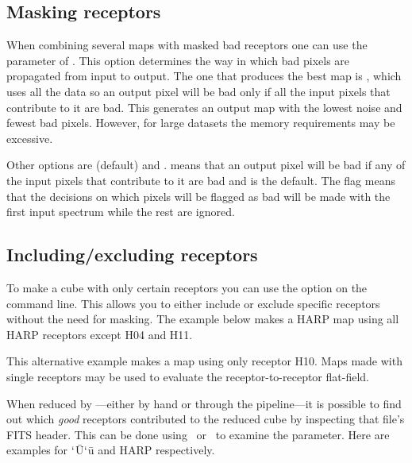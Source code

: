 \documentclass[11pt,oneside,chapters]{starlink}
\begin{document}
\subsection{Masking receptors}

When combining several maps with masked bad receptors one can use the
 parameter of \makecube. This option determines the way
in which bad pixels are propagated from input to output. The one that
produces the best map is , which uses all the data
so an output pixel will be bad only if all the input pixels that
contribute to it are bad. This generates an output map with the lowest
noise and fewest bad pixels. However, for large datasets the memory
requirements may be excessive.

Other options are  (default) and
.  means that an output pixel will be
bad if any of the input pixels that contribute to it are bad and is
the default.  The flag  means that the decisions on which pixels
will be flagged as bad will be made with the first input spectrum
while the rest are ignored.

\subsection{Including/excluding receptors}
\label{sec:incexc_receptors}

To make a cube with only certain receptors you can use the
 option on the command line. This allows you to
either include or exclude specific receptors without the need for
masking. The example below makes a HARP map using all HARP
receptors except H04 and H11.
\begin{terminalv}
\end{terminalv}
This alternative example makes a map using only receptor H10. Maps
made with single receptors may be used to evaluate the
receptor-to-receptor flat-field.
\begin{terminalv}
\end{terminalv}


When reduced by \makecube---either by hand or through the
pipeline---it is possible to find out which \emph{good} receptors
contributed to the reduced cube by inspecting that file's FITS header.
This can be done using \fitslist\ or \fitsval\ to examine the
 parameter.  Here are examples for $`$\=U$`$\=u and HARP
respectively.
\end{document}
